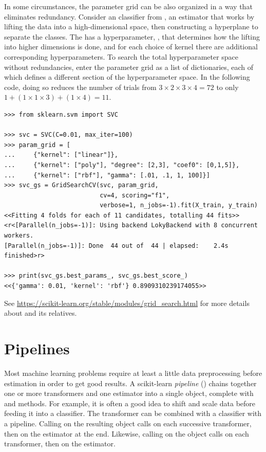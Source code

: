 In some circumstances, the parameter grid can be also organized in a way that eliminates redundancy.
Consider an  classifier from , an estimator that works by lifting the data into a high-dimensional space, then constructing a hyperplane to separate the classes.
The  has a hyperparameter, , that determines how the lifting into higher dimensions is done, and for each choice of kernel there are additional corresponding hyperparameters.
To search the total hyperparameter space without redundancies, enter the parameter grid as a list of dictionaries, each of which defines a different section of the hyperparameter space.
In the following code, doing so reduces the number of trials from $3\times 2 \times 3\times 4 = 72$ to only $1 + (1\times 1\times 3) + (1\times 4) = 11$.

\begin{lstlisting}
>>> from sklearn.svm import SVC

>>> svc = SVC(C=0.01, max_iter=100)
>>> param_grid = [
...     {"kernel": ["linear"]},
...     {"kernel": ["poly"], "degree": [2,3], "coef0": [0,1,5]},
...     {"kernel": ["rbf"], "gamma": [.01, .1, 1, 100]}]
>>> svc_gs = GridSearchCV(svc, param_grid,
                          cv=4, scoring="f1",
                          verbose=1, n_jobs=-1).fit(X_train, y_train)
<<Fitting 4 folds for each of 11 candidates, totalling 44 fits>>
<r<[Parallel(n_jobs=-1)]: Using backend LokyBackend with 8 concurrent workers.
[Parallel(n_jobs=-1)]: Done  44 out of  44 | elapsed:    2.4s finished>r>

>>> print(svc_gs.best_params_, svc_gs.best_score_)
<<{'gamma': 0.01, 'kernel': 'rbf'} 0.8909310239174055>>
\end{lstlisting}

See \url{https://scikit-learn.org/stable/modules/grid_search.html} for more details about  and its relatives.

\section*{Pipelines} %

Most machine learning problems require at least a little data preprocessing before estimation in order to get good results.
A scikit-learn \emph{pipeline} () chains together one or more transformers and one estimator into a single object, complete with  and  methods.
For example, it is often a good idea to shift and scale data before feeding it into a classifier.
The  transformer can be combined with a classifier with a pipeline.
Calling  on the resulting object calls  on each successive transformer, then  on the estimator at the end.
Likewise, calling  on the  object calls  on each transformer, then  on the estimator.

